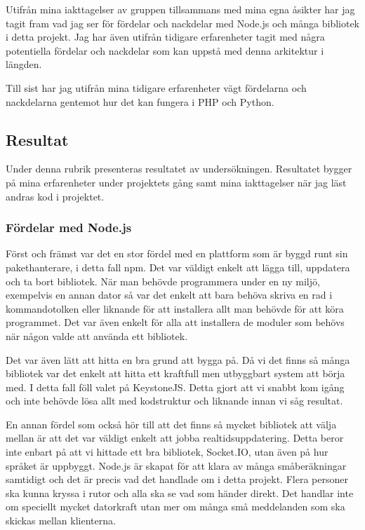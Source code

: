 Utifrån mina iakttagelser av gruppen tillsammans med mina egna åsikter har jag tagit fram vad jag ser för fördelar och nackdelar med Node.js och många bibliotek i detta projekt. Jag har även utifrån tidigare erfarenheter tagit med några potentiella fördelar och nackdelar som kan uppstå med denna arkitektur i längden.

Till sist har jag utifrån mina tidigare erfarenheter vägt fördelarna och nackdelarna gentemot hur det kan fungera i PHP och Python. 

\subsection{Resultat}

Under denna rubrik presenteras resultatet av undersökningen. Resultatet bygger på mina erfarenheter under projektets gång samt mina iakttagelser när jag läst andras kod i projektet.

\subsubsection{Fördelar med Node.js}

Först och främst var det en stor fördel med en plattform som är byggd runt sin pakethanterare, i detta fall npm. Det var väldigt enkelt att lägga till, uppdatera och ta bort bibliotek. När man behövde programmera under en ny miljö, exempelvis en annan dator så var det enkelt att bara behöva skriva en rad i kommandotolken eller liknande för att installera allt man behövde för att köra programmet. Det var även enkelt för alla att installera de moduler som behövs när någon valde att använda ett bibliotek.

Det var även lätt att hitta en bra grund att bygga på. Då vi det finns så många bibliotek var det enkelt att hitta ett kraftfull men utbyggbart system att börja med. I detta fall föll valet på KeystoneJS. Detta gjort att vi snabbt kom igång och inte behövde lösa allt med kodstruktur och liknande innan vi såg resultat.

En annan fördel som också hör till att det finns så mycket bibliotek att välja mellan är att det var väldigt enkelt att jobba realtidsuppdatering. Detta beror inte enbart på att vi hittade ett bra bibliotek, Socket.IO, utan även på hur språket är uppbyggt. Node.js är skapat för att klara av många småberäkningar samtidigt och det är precis vad det handlade om i detta projekt. Flera personer ska kunna kryssa i rutor och alla ska se vad som händer direkt. Det handlar inte om speciellt mycket datorkraft utan mer om många små meddelanden som ska skickas mellan klienterna.


